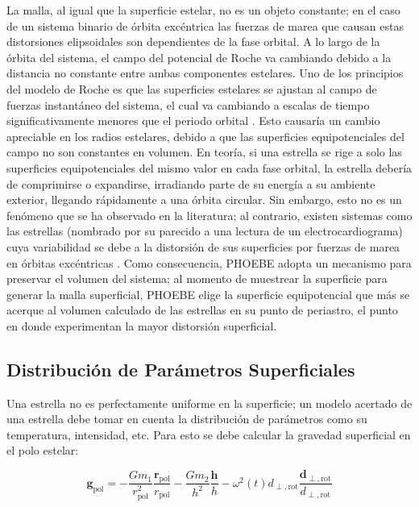 La malla, al igual que la superficie estelar, no es un objeto constante; en el
caso de un sistema binario de órbita excéntrica las fuerzas de marea que causan
estas distorsiones elipsoidales son dependientes de la fase orbital. A lo largo
de la órbita del sistema, el campo del potencial de Roche va cambiando debido a
la distancia no constante entre ambas componentes estelares. Uno de los
principios del modelo de Roche es que las superficies estelares se ajustan al
campo de fuerzas instantáneo del sistema, el cual va cambiando a escalas de
tiempo significativamente menores que el periodo orbital
\autocite{prsa_phoebe_increased_model_fidelity_mesh_2016}. Esto causaría un
cambio apreciable en los radios estelares, debido a que las superficies
equipotenciales del campo no son constantes en volumen. En teoría, si una
estrella se rige a solo las superficies equipotenciales del mismo valor en cada
fase orbital, la estrella debería de comprimirse o expandirse, irradiando parte
de su energía a su ambiente exterior, llegando rápidamente a una órbita
circular. Sin embargo, esto no es un fenómeno que se ha observado en la
literatura; al contrario, existen sistemas como las estrellas 
(nombrado por su parecido a una lectura de un electrocardiograma) cuya
variabilidad se debe a la distorsión de sus superficies por fuerzas de marea en
órbitas excéntricas
\autocite{thompson_class_eccentric_binaries_tidal_distortion_heartbeat_2012}.
Como consecuencia, PHOEBE adopta un mecanismo para preservar el volumen del
sistema; al momento de muestrear la superficie para generar la malla
superficial, PHOEBE elige la superficie equipotencial que más se acerque al
volumen calculado de las estrellas en su punto de periastro, el punto en donde
experimentan la mayor distorsión superficial.

\subsection{Distribución de Parámetros Superficiales}

Una estrella no es perfectamente uniforme en la superficie; un modelo acertado
de una estrella debe tomar en cuenta la distribución de parámetros como su
temperatura, intensidad, etc. Para esto se debe calcular la gravedad superficial
en el polo estelar:

\begin{eqfloat}[!ht]
	\centering
	\begin{equation}
		\textbf{g}_{\textrm{pol}} = -\frac{G m_1}{r_{\textrm{pol}}^2} \frac{\textbf{r}_{\mathrm{pol}}}{r_{\mathrm{pol}}} - \frac{G m_2}{h^2} \frac{\textbf{h}}{h} - \omega^2(t) d_{\perp,\textrm{rot}} \frac{\textbf{d}_{\perp,\textrm{rot}}}{d_{\perp,\textrm{rot}}} 
	\end{equation}
\end{eqfloat}

